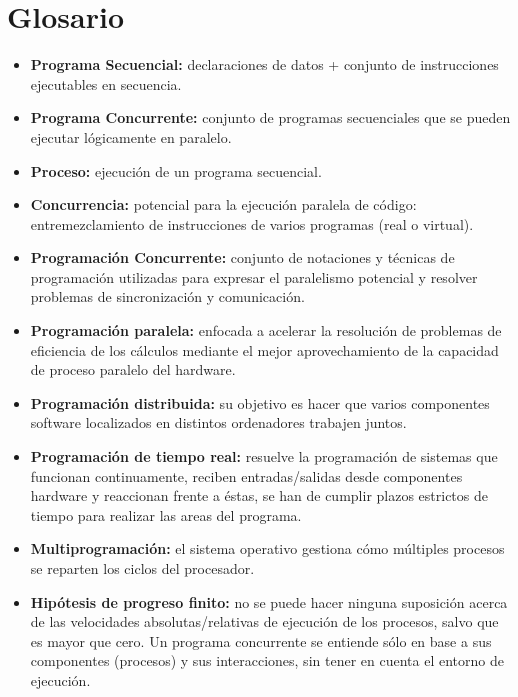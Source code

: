 \documentclass[a4paper,11pt]{article}
\begin{document}
\section{Glosario}
\begin{itemize}
\item \textbf{Programa Secuencial:} declaraciones de datos + conjunto de instrucciones ejecutables en secuencia.

\item \textbf{Programa Concurrente:} conjunto de programas secuenciales que se pueden ejecutar lógicamente en paralelo.

\item \textbf{Proceso:} ejecución de un programa secuencial.

\item \textbf{Concurrencia:} potencial para la ejecución paralela de código: entremezclamiento de instrucciones de varios programas (real o virtual).

\item \textbf{Programación Concurrente:} conjunto de notaciones y técnicas de programación utilizadas para expresar el paralelismo potencial y resolver problemas de sincronización y comunicación.

\item \textbf{Programación paralela:} enfocada a acelerar la resolución de problemas de eficiencia de los cálculos mediante el mejor aprovechamiento de la capacidad de proceso paralelo del hardware.

\item \textbf{Programación distribuida:} su objetivo es hacer que varios componentes software localizados en distintos ordenadores trabajen juntos.

\item \textbf{Programación de tiempo real:} resuelve la programación de sistemas que funcionan continuamente, reciben entradas/salidas desde componentes hardware y reaccionan frente a éstas, se han de cumplir plazos estrictos de tiempo para realizar las areas del programa.

\item \textbf{Multiprogramación:} el sistema operativo gestiona cómo múltiples procesos se reparten los ciclos del procesador.

\item \textbf{Hipótesis de progreso finito:} no se puede hacer ninguna suposición acerca de las velocidades absolutas/relativas de ejecución de los procesos, salvo que es mayor que cero. Un programa concurrente se entiende sólo en base a sus componentes (procesos) y sus interacciones, sin tener en cuenta el entorno de ejecución.


\end{itemize}
\end{document}
